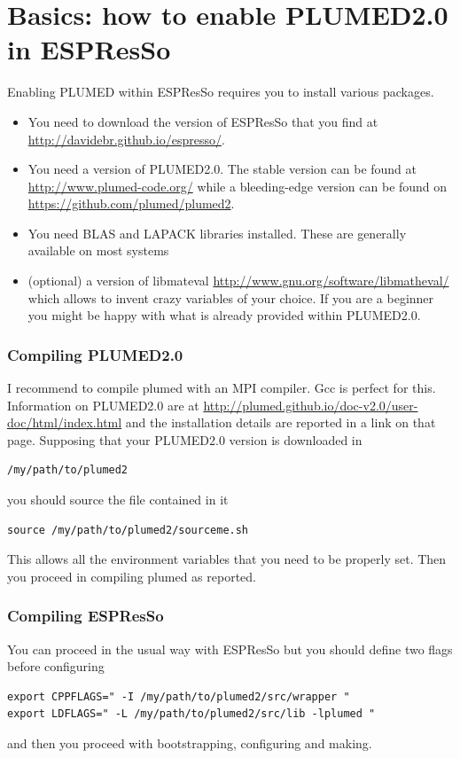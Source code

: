 \documentclass[10pt,fleqn,a4paper]{report}
\begin{document}
\chapter{Basics: how to enable PLUMED2.0 in ESPResSo}

Enabling PLUMED within ESPResSo requires you to install various packages.
\begin{itemize} 
\item You need to download the version of ESPResSo that you find at 
\url{http://davidebr.github.io/espresso/}. 
\item You need a version of PLUMED2.0. The stable version can be found at 
\url{http://www.plumed-code.org/} while a bleeding-edge version can be found on
\url{https://github.com/plumed/plumed2}.
\item You need BLAS and LAPACK libraries installed. These are generally available on most systems
\item (optional) a version of libmateval \url{http://www.gnu.org/software/libmatheval/} which allows to invent crazy variables of your choice. If you are a beginner you might be happy with what is already provided within PLUMED2.0.
\end{itemize}

\subsection{Compiling PLUMED2.0}
I recommend to compile plumed with an MPI compiler. Gcc is perfect for this.
Information on PLUMED2.0 are at \url{http://plumed.github.io/doc-v2.0/user-doc/html/index.html} and the installation details are reported in a link on that page. 
Supposing that your PLUMED2.0 version is downloaded in
\begin{verbatim}
/my/path/to/plumed2
\end{verbatim}
you should source the file contained in it
\begin{verbatim}
source /my/path/to/plumed2/sourceme.sh
\end{verbatim}
This allows all the environment variables that you need to be properly set.
Then you proceed in compiling plumed as reported.

\subsection{Compiling ESPResSo}
You can proceed in the usual way with ESPResSo but you should define two flags before configuring
\begin{verbatim}
export CPPFLAGS=" -I /my/path/to/plumed2/src/wrapper "
export LDFLAGS=" -L /my/path/to/plumed2/src/lib -lplumed "
\end{verbatim}
and then you proceed with bootstrapping, configuring and making.
\end{document}

